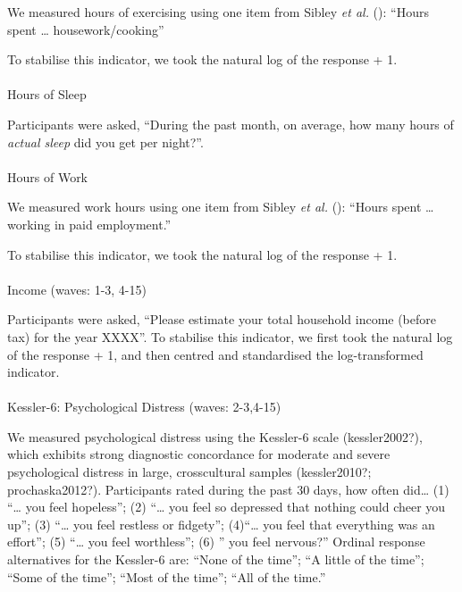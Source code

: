 \documentclass[
  single column]{article}
\makeatletter
\let\oldparagraph\paragraph
\renewcommand{\paragraph}{
    \@ifstar
      \xxxParagraphStar
      \xxxParagraphNoStar
  }
\newcommand{\xxxParagraphStar}[1]{\oldparagraph*{#1}\mbox{}}
\newcommand{\xxxParagraphNoStar}[1]{\oldparagraph{#1}\mbox{}}
\makeatother
\begin{document}
We measured hours of exercising using one item from Sibley \emph{et al.}
(): ``Hours spent \ldots{}
housework/cooking''

To stabilise this indicator, we took the natural log of the response +
1.

\paragraph{Hours of Sleep}\label{hours-of-sleep}

Participants were asked, ``During the past month, on average, how many
hours of \emph{actual sleep} did you get per night?''.

\paragraph{Hours of Work}\label{hours-of-work}

We measured work hours using one item from Sibley \emph{et al.}
(): ``Hours spent \ldots{} working in
paid employment.''

To stabilise this indicator, we took the natural log of the response +
1.

\paragraph{Income (waves: 1-3, 4-15)}\label{income-waves-1-3-4-15}

Participants were asked, ``Please estimate your total household income
(before tax) for the year XXXX''. To stabilise this indicator, we first
took the natural log of the response + 1, and then centred and
standardised the log-transformed indicator.

\paragraph{Kessler-6: Psychological Distress (waves:
2-3,4-15)}\label{kessler-6-psychological-distress-waves-2-34-15}

We measured psychological distress using the Kessler-6 scale
(kessler2002?), which exhibits strong diagnostic concordance for
moderate and severe psychological distress in large, crosscultural
samples (kessler2010?; prochaska2012?). Participants rated during the
past 30 days, how often did\ldots{} (1) ``\ldots{} you feel hopeless'';
(2) ``\ldots{} you feel so depressed that nothing could cheer you up'';
(3) ``\ldots{} you feel restless or fidgety''; (4)``\ldots{} you feel
that everything was an effort''; (5) ``\ldots{} you feel worthless'';
(6) '' you feel nervous?'' Ordinal response alternatives for the
Kessler-6 are: ``None of the time''; ``A little of the time''; ``Some of
the time''; ``Most of the time''; ``All of the time.''
\end{document}
